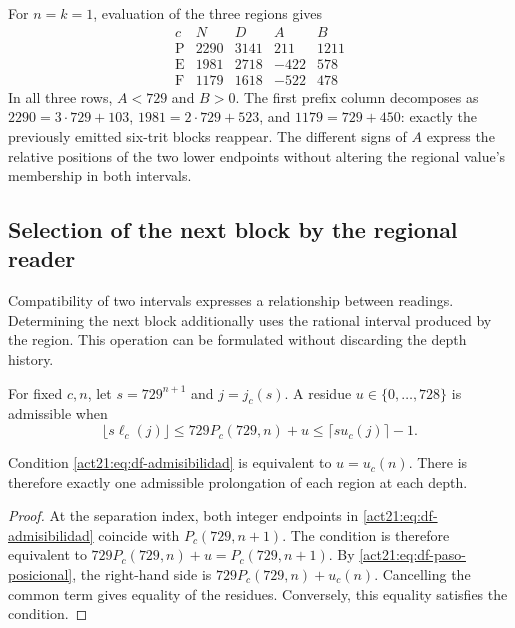 \begin{example}
For \(n=k=1\), evaluation of the three regions gives
\[
\begin{array}{c|rr|rr}
 c&N&D&A&B\\\hline
 \mathrm P&2290&3141&211&1211\\
 \mathrm E&1981&2718&-422&578\\
 \mathrm F&1179&1618&-522&478
\end{array}
\]
In all three rows, \(A<729\) and \(B>0\). The first prefix column
decomposes as \(2290=3\cdot729+103\),
\(1981=2\cdot729+523\), and \(1179=729+450\): exactly the previously
emitted six-trit blocks reappear. The different signs of \(A\) express
the relative positions of the two lower endpoints without altering the
regional value's membership in both intervals.
\end{example}

\subsection{Selection of the next block by the regional reader}

Compatibility of two intervals expresses a relationship between readings.
Determining the next block additionally uses the rational interval
produced by the region. This operation can be formulated without
discarding the depth history.

\begin{definition}
For fixed \(c,n\), let \(s=729^{n+1}\) and \(j=j_c(s)\). A residue
\(u\in\{0,\ldots,728\}\) is admissible when
\begin{equation}
 \lfloor s\ell_c(j)\rfloor
 \leq729P_c(729,n)+u
 \leq\lceil su_c(j)\rceil-1.
 \label{act21:eq:df-admisibilidad}
\end{equation}
\end{definition}

\begin{theorem}
\label{act21:thm:df-prolongacion-unica}
Condition \eqref{act21:eq:df-admisibilidad} is equivalent to \(u=u_c(n)\).
There is therefore exactly one admissible prolongation of each region
at each depth.
\end{theorem}

\begin{proof}
At the separation index, both integer endpoints in
\eqref{act21:eq:df-admisibilidad} coincide with \(P_c(729,n+1)\).
The condition is therefore equivalent to
\(729P_c(729,n)+u=P_c(729,n+1)\).
By \eqref{act21:eq:df-paso-posicional}, the right-hand side is
\(729P_c(729,n)+u_c(n)\). Cancelling the common term gives equality
of the residues. Conversely, this equality satisfies the condition.
\end{proof}

